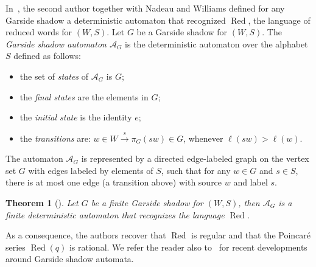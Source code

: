 \documentclass{amsart}
\newtheorem{Theorem}{Theorem}[section]
\theoremstyle{definition}
\newcommand{\Red}{{\operatorname{Red}}}
\begin{document}
\smallskip
In~\cite{HNW}, the second author together with Nadeau and Williams defined for any Garside shadow a deterministic automaton that recognized $\Red$, the language of reduced words for $(W,S)$.  Let $G$ be a Garside shadow for $(W,S)$. The  {\em Garside shadow automaton $\mathcal A_G$} is the deterministic automaton over the alphabet $S$ defined as follows:
\begin{itemize}
\item the set of {\em states} of $\mathcal A_G$ is $G$;
\item the {\em final states} are the elements in $G$;
\item the {\em initial state} is the identity $e$;
\item the {\em transitions} are: $w\in W \xrightarrow{s} \pi_G(sw)\in G$, whenever $\ell(sw)>\ell(w)$.
\end{itemize}
The automaton $\mathcal A_G$ is represented by a directed edge-labeled graph on the vertex set $G$ with edges labeled by elements of $S$, such that for any $w \in G$ and $s \in S$, there is at most one edge (a transition above) with source $w$ and label $s$.

\begin{Theorem}[{\cite[Theorem~1.2]{HNW}}]\label{thm:GarsideAutomaton} Let $G$ be a finite Garside shadow for $(W,S)$, then $\mathcal A_G$ is a finite deterministic automaton that  recognizes the language $\Red$.
\end{Theorem}

As a consequence, the authors recover that $\Red$ is regular and that the Poincar\'e series $\Red(q)$ is rational. We refer the reader also to~\cite{PY22,PY24,Sa25} for recent developments around Garside shadow automata. 
\end{document}
